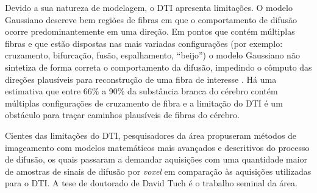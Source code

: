 \documentclass[
    12pt,                %
    oneside,            %
    a4paper,            %
    english,            %
    french,                %
    spanish,            %
    brazil                %
    ]{abntex2}
\begin{document}

Devido a sua natureza de modelagem, o DTI apresenta limitações. O modelo Gaussiano descreve bem regiões de fibras em que o comportamento de difusão ocorre predominantemente em uma direção. Em pontos que contém múltiplas fibras e que estão dispostas nas mais variadas configurações (por exemplo: cruzamento, bifurcação, fusão, espalhamento,  ``beijo'') o modelo Gaussiano não sintetiza de forma correta o comportamento da difusão, impedindo o cômputo das direções plausíveis para reconstrução de uma fibra de interesse \cite{fillard2011, daducci2014}. Há uma estimativa que entre 66\% a 90\% da substância branca do cérebro contém múltiplas configurações de cruzamento de fibra \cite{descoteaux2015} e a limitação do DTI é um obstáculo para traçar caminhos plausíveis de fibras do cérebro.

Cientes das limitações do DTI, pesquisadores da área propuseram métodos de imageamento com modelos matemáticos mais avançados e descritivos do processo de difusão, os quais passaram a demandar aquisições
com uma quantidade maior de amostras de sinais de difusão por \textit{voxel} em comparação às aquisições utilizadas para o DTI. %
A tese de doutorado de David Tuch \cite{tuch2002} é o trabalho seminal da área.
\end{document}
